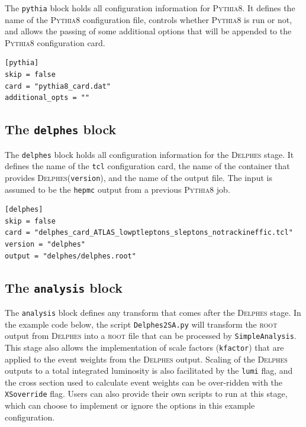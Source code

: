 \documentclass{article}
\newcommand{\simpleanalysis}{\texttt{SimpleAnalysis}}
\newcommand{\pythia}{\textsc{Pythia8}}
\newcommand{\delphes}{\textsc{Delphes}}
\newcommand{\ROOT}{\textsc{root}}
\newcommand{\toml}{\textsc{toml}}
\begin{document}
The \texttt{pythia} block holds all configuration information for \pythia.  It defines the name of the \pythia{} configuration file, controls whether \pythia{} is run or not, and allows the passing of some additional options that will be appended to the \pythia{} configuration card.

\begin{listing}[H]
	\begin{verbatim}
[pythia]
skip = false
card = "pythia8_card.dat"
additional_opts = ""
        \end{verbatim}
	\caption{The \texttt{pythia} block of an example \toml{} configuration file for generating slepton events.}
	\label{slepton-config-pythia}
\end{listing}

\subsection{The \texttt{delphes} block}
\label{ssec:the-delphes-block}

The \texttt{delphes} block holds all configuration information for the \delphes{} stage.  It defines the name of the \texttt{tcl} configuration card, the name of the container that provides \delphes (\texttt{version}), and the name of the output file.  The input is assumed to be the \texttt{hepmc} output from a previous \pythia{} job.

\begin{listing}[H]
	\begin{verbatim}
[delphes]
skip = false
card = "delphes_card_ATLAS_lowptleptons_sleptons_notrackineffic.tcl"
version = "delphes"
output = "delphes/delphes.root"
        \end{verbatim}
	\caption{The \texttt{delphes} block of an example \toml{} configuration file for generating slepton events.}
	\label{slepton-config-delphes}
\end{listing}

\subsection{The \texttt{analysis} block}
\label{ssec:the-analysis-block}

The \texttt{analysis} block defines any transform that comes after the \delphes{} stage.  In the example code below, the script \texttt{Delphes2SA.py} will transform the \ROOT{} output from \delphes{} into a \ROOT{} file that can be processed by \simpleanalysis.  This stage also allows the implementation of scale factors (\texttt{kfactor}) that are applied to the event weights from the \delphes{} output.  Scaling of the \delphes{} outputs to a total integrated luminosity is also facilitated by the \texttt{lumi} flag, and the cross section used to calculate event weights can be over-ridden with the \texttt{XSoverride} flag.  Users can also provide their own scripts to run at this stage, which can choose to implement or ignore the options in this example configuration.
\end{document}
